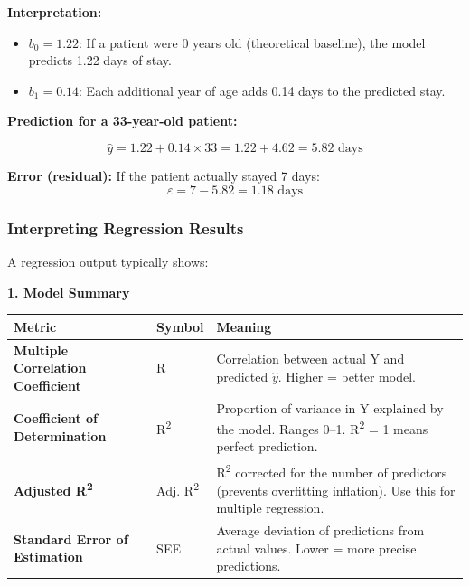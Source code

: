 \documentclass[12pt,openany]{book}
\begin{document}
\textbf{Interpretation:}
\begin{itemize}[leftmargin=*]
    \item \(b_0 = 1.22\): If a patient were 0 years old (theoretical baseline), the model predicts 1.22 days of stay.
    \item \(b_1 = 0.14\): Each additional year of age adds 0.14 days to the predicted stay.

\end{itemize}

\textbf{Prediction for a 33-year-old patient:}

\[
\hat{y} = 1.22 + 0.14 \times 33 = 1.22 + 4.62 = 5.82 \text{ days}
\]


\textbf{Error (residual):} If the patient actually stayed 7 days:
\[
\varepsilon = 7 - 5.82 = 1.18 \text{ days}
\]


\medskip


\subsubsection{Interpreting Regression Results}


A regression output typically shows:

\textbf{1. Model Summary}

\begin{center}
\small
\renewcommand{\arraystretch}{1.15}
\begin{tabular}{|L{0.22\textwidth}|L{0.30\textwidth}|L{0.36\textwidth}|}
\hline
    Metric & Symbol & Meaning \\
\hline
    \textbf{Multiple Correlation Coefficient} & R & Correlation between actual Y and predicted \(\hat{y}\). Higher = better model. \\
\hline
    \textbf{Coefficient of Determination} & R\textsuperscript{2} & Proportion of variance in Y explained by the model. Ranges 0--1. R\textsuperscript{2} = 1 means perfect prediction. \\
\hline
    \textbf{Adjusted R\textsuperscript{2}} & Adj. R\textsuperscript{2} & R\textsuperscript{2} corrected for the number of predictors (prevents overfitting inflation). Use this for multiple regression. \\
\hline
    \textbf{Standard Error of Estimation} & SEE & Average deviation of predictions from actual values. Lower = more precise predictions. \\
\hline
\end{tabular}
\end{center}
\normalsize
\end{document}
